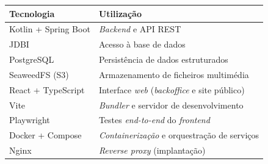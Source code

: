 \documentclass[12pt,a4paper]{article}
\begin{document}
\begin{center}
  \begin{tabularx}{0.85\textwidth}{@{}lX@{}}
    \toprule
    \textbf{Tecnologia}  & \textbf{Utilização}                                         \\
    \midrule
    Kotlin + Spring Boot & \textit{Backend} e API REST                                 \\
    JDBI                 & Acesso à base de dados                                      \\
    PostgreSQL           & Persistência de dados estruturados                          \\
    SeaweedFS (S3)       & Armazenamento de ficheiros multimédia                       \\
    React + TypeScript   & Interface \textit{web} (\textit{backoffice} e site público) \\
    Vite                 & \textit{Bundler} e servidor de desenvolvimento              \\
    Playwright           & Testes \textit{end-to-end} do \textit{frontend}             \\
    Docker + Compose     & \textit{Containerização} e orquestração de serviços         \\
    Nginx                & \textit{Reverse proxy} (implantação)                        \\
    \bottomrule
  \end{tabularx}
\end{center}
\end{document}
